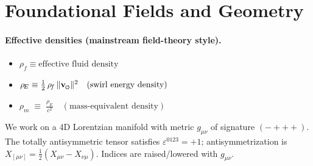 \documentclass[smallextended]{svjour3}       %
\newcommand{\vnorm}{\lVert \mathbf{v}_{\mkern-2mu\scriptscriptstyle\boldsymbol{\circlearrowleft}} \rVert} %
\newcommand{\rhoF}{\rho_{\!f}}      %
\newcommand{\rhoE}{\rho_{\!E}}      %
\newcommand{\rhoM}{\rho_{\!m}}      %
\begin{document}
	\section{Foundational Fields and Geometry}
	\paragraph{Effective densities (mainstream field-theory style).}
	\begin{itemize}
		\item $\rhoF \equiv \text{effective fluid density}$
		\item $\rhoE \equiv \tfrac12\,\rhoF\,\vnorm^{2}\quad(\text{swirl energy density})$
        \item $\rhoM \;\equiv\; \frac{\rhoE}{c^2}\quad(\text{mass-equivalent density})$
	\end{itemize}


	We work on a 4D Lorentzian manifold with metric \(g_{\mu\nu}\) of signature \((-+++)\). The totally antisymmetric tensor satisfies \(\varepsilon^{0123}=+1\); antisymmetrization is \(X_{[\mu\nu]}=\tfrac12(X_{\mu\nu}-X_{\nu\mu})\). Indices are raised/lowered with \(g_{\mu\nu}\).
\end{document}
